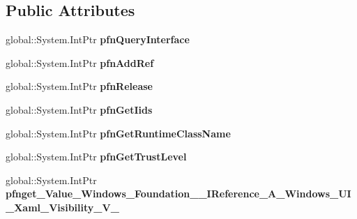 \subsection*{Public Attributes}
\begin{DoxyCompactItemize}
\item 
\mbox{\label{struct_system_1_1_nullable___a___windows___u_i___xaml___visibility___v_______impl_1_1_vtbl_a0eb1bdeaf8d0594f2db79156b76d9d0a}} 
global\+::\+System.\+Int\+Ptr {\bfseries pfn\+Query\+Interface}
\item 
\mbox{\label{struct_system_1_1_nullable___a___windows___u_i___xaml___visibility___v_______impl_1_1_vtbl_afe6f35f45c60c05843fa161ab4843551}} 
global\+::\+System.\+Int\+Ptr {\bfseries pfn\+Add\+Ref}
\item 
\mbox{\label{struct_system_1_1_nullable___a___windows___u_i___xaml___visibility___v_______impl_1_1_vtbl_a0b96302b77575d22bd41167205f796f4}} 
global\+::\+System.\+Int\+Ptr {\bfseries pfn\+Release}
\item 
\mbox{\label{struct_system_1_1_nullable___a___windows___u_i___xaml___visibility___v_______impl_1_1_vtbl_a6496ff2d73a249ebc73663f96529ca0b}} 
global\+::\+System.\+Int\+Ptr {\bfseries pfn\+Get\+Iids}
\item 
\mbox{\label{struct_system_1_1_nullable___a___windows___u_i___xaml___visibility___v_______impl_1_1_vtbl_a0696d8d1b3846a28976b1ad78263d46b}} 
global\+::\+System.\+Int\+Ptr {\bfseries pfn\+Get\+Runtime\+Class\+Name}
\item 
\mbox{\label{struct_system_1_1_nullable___a___windows___u_i___xaml___visibility___v_______impl_1_1_vtbl_a645f93a00c9188baee3b8fa377e230d7}} 
global\+::\+System.\+Int\+Ptr {\bfseries pfn\+Get\+Trust\+Level}
\item 
\mbox{\label{struct_system_1_1_nullable___a___windows___u_i___xaml___visibility___v_______impl_1_1_vtbl_a5f8fddcbf5750452a2be3a5035072d6d}} 
global\+::\+System.\+Int\+Ptr {\bfseries pfnget\+\_\+\+Value\+\_\+\+Windows\+\_\+\+Foundation\+\_\+\+\_\+\+I\+Reference\+\_\+\+A\+\_\+\+Windows\+\_\+\+U\+I\+\_\+\+Xaml\+\_\+\+Visibility\+\_\+\+V\+\_\+}
\end{DoxyCompactItemize}

